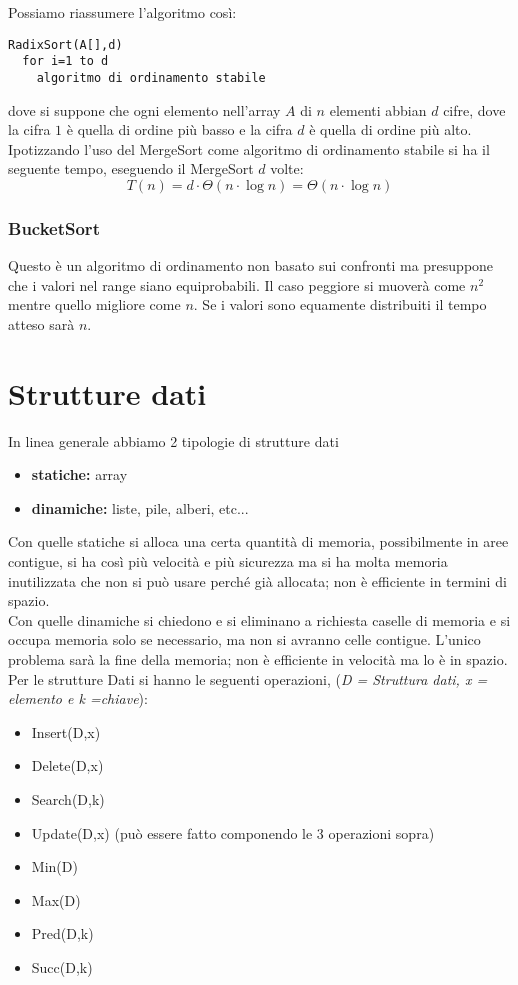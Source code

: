 \documentclass[a4paper,12pt,oneside,tikz]{book}
\begin{document}
Possiamo riassumere l'algoritmo così:
\begin{verbatim}
RadixSort(A[],d)
  for i=1 to d
    algoritmo di ordinamento stabile
\end{verbatim}
dove si suppone che ogni elemento nell'array $A$ di $n$ elementi abbian $d$ cifre, dove la cifra $1$ è quella di ordine più basso e la cifra $d$ è quella di ordine più alto.\\
Ipotizzando l'uso del MergeSort come algoritmo di ordinamento stabile si ha il seguente tempo, eseguendo il MergeSort $d$ volte:
$$T(n)=d\cdot \Theta(n\cdot\log n)=\Theta(n\cdot \log n)$$

\subsection{BucketSort}
Questo è un algoritmo di ordinamento non basato sui confronti ma presuppone che i valori nel range siano equiprobabili. Il caso peggiore si muoverà come $n^2$ mentre quello migliore come $n$. Se i valori sono equamente distribuiti il tempo atteso sarà $n$.

\chapter{Strutture dati}
In linea generale abbiamo 2 tipologie di strutture dati
\begin{itemize}
\item \textbf{statiche:} array
\item \textbf{dinamiche:} liste, pile, alberi, etc...
\end{itemize}
Con quelle statiche si alloca una certa quantità di memoria, possibilmente in aree contigue, si ha così più velocità e più sicurezza ma si ha molta memoria inutilizzata che non si può usare perché già allocata; non è efficiente in termini di spazio.\\
Con quelle dinamiche si chiedono e si eliminano a richiesta caselle di memoria e si occupa memoria solo se necessario, ma non si avranno celle contigue. L'unico problema sarà la fine della memoria; non è efficiente in velocità ma lo è in spazio.
\newpage 
Per le strutture Dati si hanno le seguenti operazioni, (\textit{D = Struttura dati, x = elemento e k =chiave}):
\begin{itemize}
\item Insert(D,x)
\item Delete(D,x)
\item Search(D,k)
\item Update(D,x) (può essere fatto componendo le 3 operazioni sopra)
\item Min(D)
\item Max(D)
\item Pred(D,k)
\item Succ(D,k)
\end{itemize}
\end{document}
